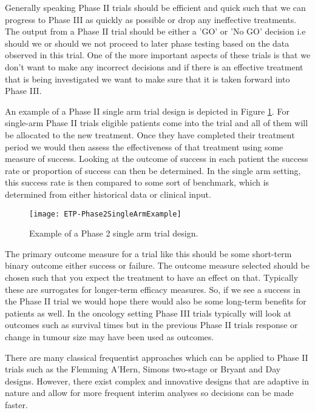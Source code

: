 Generally speaking Phase \RN{2} trials should be efficient and quick such that we can progress to Phase \RN{3} as quickly as possible or drop any ineffective treatments. The output from a Phase \RN{2} trial should be either a 'GO' or 'No GO' decision i.e should we or should we not proceed to later phase testing based on the data observed in this trial. One of the more important aspects of these trials is that we don't want to make any incorrect decisions and if there is an effective treatment that is being investigated we want to make sure that it is taken forward into Phase \RN{3}.

An example of a Phase II single arm trial design is depicted in Figure \ref{fig_etp:phase2_singlearm_example}. For single-arm Phase \RN{2} trials eligible patients come into the trial and all of them will be allocated to the new treatment. Once they have completed their treatment period we would then assess the effectiveness of that treatment using some measure of success. Looking at the outcome of success in each patient the success rate or proportion of success can then be determined. In the single arm setting, this success rate is then compared to some sort of benchmark, which is determined from either historical data or clinical input.


\begin{figure}[h!]
	\centering
	\caption{Example of a Phase 2 single arm trial design.}
	\label{fig_etp:phase2_singlearm_example}
	\texttt{[image: ETP-Phase2SingleArmExample]}
\end{figure}

The primary outcome measure for a trial like this should be some short-term binary outcome either success or failure. The outcome measure selected should be chosen such that you expect the treatment to have an effect on that. Typically these are surrogates for longer-term efficacy measures. So, if we see a success in the Phase II trial we would hope there would also be some long-term benefits for patients as well. In the oncology setting Phase III trials typically will look at outcomes such as survival times but in the previous Phase II trials response or change in tumour size may have been used as outcomes.

There are many classical frequentist approaches which can be applied to Phase \RN{2} trials such as the Flemming A'Hern, Simons two-stage or Bryant and Day designs. However, there exist complex and innovative designs that are adaptive in nature and allow for more frequent interim analyses so decisions can be made faster. 

